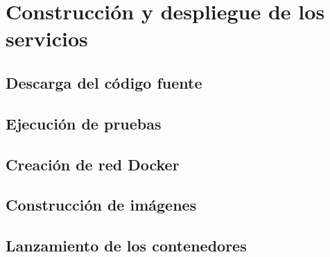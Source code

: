 \section{Construcción y despliegue de los servicios}

\subsection{Descarga del código fuente}

\subsection{Ejecución de pruebas}

\subsection{Creación de red Docker}

\subsection{Construcción de imágenes}

\subsection{Lanzamiento de los contenedores}
